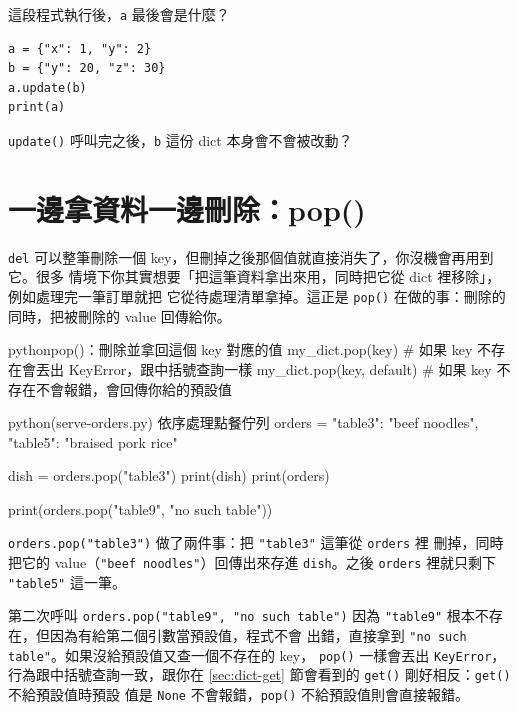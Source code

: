 \begin{drills}[label=drills:dict-update]
\item 這段程式執行後，\texttt{a} 最後會是什麼？
\begin{verbatim}
a = {"x": 1, "y": 2}
b = {"y": 20, "z": 30}
a.update(b)
print(a)
\end{verbatim}
\item \texttt{update()} 呼叫完之後，\texttt{b} 這份 dict 本身會不會被改動？
\end{drills}

\section{一邊拿資料一邊刪除：pop()}
\label{sec:dict-pop}

\texttt{del} 可以整筆刪除一個 key，但刪掉之後那個值就直接消失了，你沒機會再用到它。很多
情境下你其實想要「把這筆資料拿出來用，同時把它從 dict 裡移除」，例如處理完一筆訂單就把
它從待處理清單拿掉。這正是 \texttt{pop()} 在做的事：刪除的同時，把被刪除的 value
回傳給你。

\begin{code}{python}{pop()：刪除並拿回這個 key 對應的值}
my_dict.pop(key)            # 如果 key 不存在會丟出 KeyError，跟中括號查詢一樣
my_dict.pop(key, default)   # 如果 key 不存在不會報錯，會回傳你給的預設值
\end{code}

\begin{example}{python}{(serve-orders.py) 依序處理點餐佇列}
orders = {"table3": "beef noodles", "table5": "braised pork rice"}

dish = orders.pop("table3")
print(dish)
print(orders)

print(orders.pop("table9", "no such table"))
\end{example}


\texttt{orders.pop("table3")} 做了兩件事：把 \texttt{"table3"} 這筆從 \texttt{orders} 裡
刪掉，同時把它的 value（\texttt{"beef noodles"}）回傳出來存進 \texttt{dish}。之後
\texttt{orders} 裡就只剩下 \texttt{"table5"} 這一筆。

第二次呼叫 \texttt{orders.pop("table9",
"no such table")} 因為 \texttt{"table9"} 根本不存在，但因為有給第二個引數當預設值，程式不會
出錯，直接拿到 \texttt{"no such table"}。如果沒給預設值又查一個不存在的 key，
\texttt{pop()} 一樣會丟出 \texttt{KeyError}，行為跟中括號查詢一致，跟你在
\ref{sec:dict-get} 節會看到的 \texttt{get()} 剛好相反：\texttt{get()} 不給預設值時預設
值是 \texttt{None} 不會報錯，\texttt{pop()} 不給預設值則會直接報錯。

